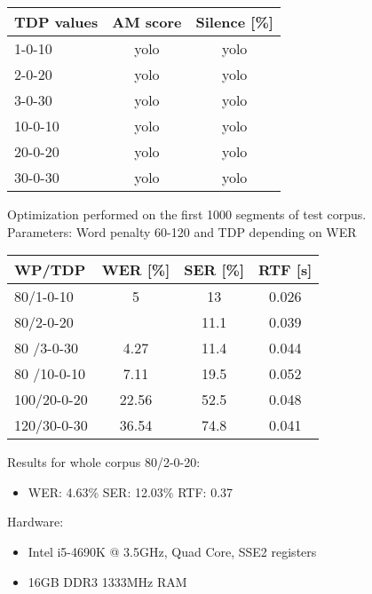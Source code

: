 \documentclass[11pt, a4paper, landscape]{article}
\begin{document}
\begin{center}
\begin{tabular}{| l |  c | c |} \toprule
  TDP values & AM score     & Silence [\%] \\ \midrule
  1-0-10     & yolo         & yolo         \\
  2-0-20     & yolo         & yolo         \\
  3-0-30     & \alert{yolo} & \alert{yolo} \\ \midrule
  10-0-10    & yolo         & yolo         \\
  20-0-20    & yolo         & yolo         \\
  30-0-30    & yolo         & yolo         \\ \bottomrule
\end{tabular}
\end{center}
\vfill


\NewPage{}
\vfill
Optimization performed on the first 1000 segments of test corpus.\\
Parameters: Word penalty 60-120 and TDP depending on WER\\
\begin{center}
	\begin{tabular}{| l | c | c | c |} \toprule
		WP/TDP      &    WER [\%]    & SER [\%]    & RTF [s]    \\ \midrule
		80/1-0-10   &    5           &    13       & 0.026      \\
		80/2-0-20   &\color{red}{4.2}&    11.1     & 0.039      \\
		80 /3-0-30  &    4.27        &    11.4     & 0.044      \\ \midrule
		80 /10-0-10 &    7.11        &    19.5     & 0.052      \\
		100/20-0-20 &    22.56       &    52.5     & 0.048      \\
		120/30-0-30 &    36.54       &    74.8     & 0.041      \\ \bottomrule
		
	\end{tabular}
\end{center}
Results for whole corpus 80/2-0-20:
\begin{itemize}
	\item WER: 4.63\% SER: 12.03\%  RTF: 0.37
\end{itemize}
\vfill

\NewPage{}
\vfill
Hardware:
\begin{itemize}
  \item Intel i5-4690K @ 3.5GHz, Quad Core, SSE2 registers
  \item 16GB DDR3 1333MHz RAM
\end{itemize}
\end{document}
